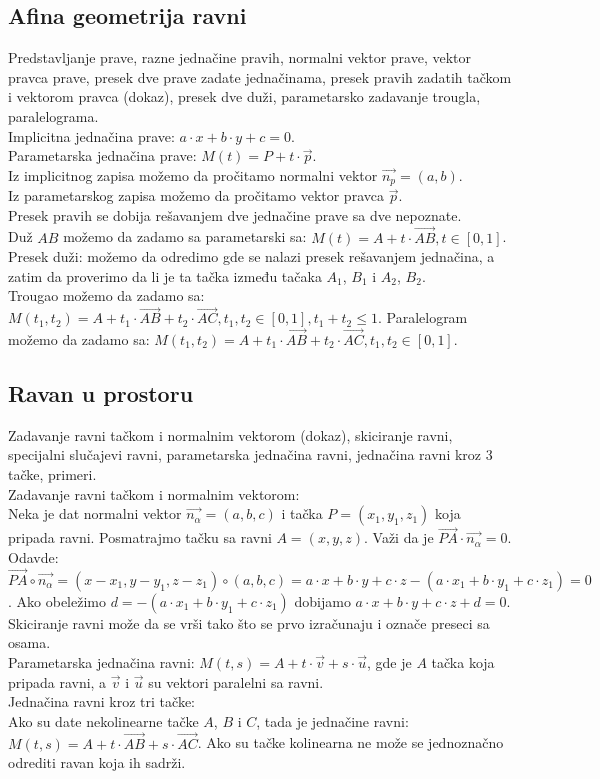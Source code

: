 \documentclass[12pt]{article}
\newcommand{\vek}[1]{\overrightarrow{#1}}
\begin{document}
\subsection{Afina geometrija ravni}
Predstavljanje prave, razne jednačine pravih, normalni
vektor prave, vektor pravca prave, presek dve prave zadate
jednačinama, presek pravih zadatih tačkom i vektorom pravca
(dokaz), presek dve duži, parametarsko zadavanje trougla,
paralelograma.
\\[1cm]
Implicitna jednačina prave: $a\cdot x+b\cdot y + c = 0$.\\
Parametarska jednačina prave: $M(t)=P+t\cdot \vek{p}$.\\
Iz implicitnog zapisa možemo da pročitamo normalni vektor $\vek{n_p}=(a,b)$.\\
Iz parametarskog zapisa možemo da pročitamo vektor pravca $\vek{p}$.\\
Presek pravih se dobija rešavanjem dve jednačine prave sa dve nepoznate.\\
Duž $AB$ možemo da zadamo sa parametarski sa: $M(t)=A+t\cdot \vek{AB}, t\in[0,1]$.\\
Presek duži: možemo da odredimo gde se nalazi presek rešavanjem jednačina,
a zatim da proverimo da li je ta tačka između tačaka $A_1$, $B_1$ i $A_2$, $B_2$.\\
Trougao možemo da zadamo sa: $M(t_1,t_2)=A+t_1\cdot \vek{AB}+t_2\cdot \vek{AC}, t_1, t_2\in[0,1], t_1+t_2\leq1$.
Paralelogram možemo da zadamo sa: $M(t_1,t_2)=A+t_1\cdot \vek{AB}+t_2\cdot \vek{AC}, t_1, t_2\in[0,1]$.
\par

\subsection{Ravan u prostoru}
Zadavanje ravni tačkom i normalnim vektorom (dokaz),
skiciranje ravni, specijalni slučajevi ravni, parametarska
jednačina ravni, jednačina ravni kroz 3 tačke, primeri.
\\[1cm]
Zadavanje ravni tačkom i normalnim vektorom:\\
Neka je dat normalni vektor $\vek{n_\alpha}=(a,b,c)$
i tačka $P=(x_1,y_1,z_1)$ koja pripada ravni.
Posmatrajmo tačku sa ravni $A=(x,y,z)$. Važi da
je $\vek{PA}\cdot\vek{n_\alpha}=0$.
Odavde:
$\vek{PA}\circ\vek{n_\alpha}=(x-x_1,y-y_1,z-z_1)\circ(a,b,c)=a\cdot x+b\cdot y+c\cdot z-(a\cdot x_1+b\cdot y_1+c\cdot z_1)=0$.
Ako obeležimo $d=-(a\cdot x_1+b\cdot y_1+c\cdot z_1)$ dobijamo $a\cdot x+b\cdot y+c\cdot z+d=0$.
Skiciranje ravni može da se vrši tako što se prvo izračunaju i označe preseci sa osama.\\
Parametarska jednačina ravni: $M(t,s)=A+t\cdot\vek{v}+s\cdot\vek{u}$,
gde je $A$ tačka koja pripada ravni, a $\vek{v}$ i $\vek{u}$
su vektori paralelni sa ravni.\\
Jednačina ravni kroz tri tačke:\\
Ako su date nekolinearne tačke $A$, $B$ i $C$, tada
je jednačine ravni: $M(t,s)=A+t\cdot\vek{AB}+s\cdot\vek{AC}$.
Ako su tačke kolinearna ne može se jednoznačno odrediti ravan koja ih sadrži.
\par
\end{document}
